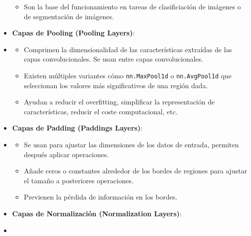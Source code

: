 \begin{itemize}
\begin{itemize}
            \item Son la base del funcionamiento en tareas de clasificiación de imágenes o de segmentación de imágenes.
        \end{itemize}
    \item \textbf{Capas de Pooling (Pooling Layers)}:
    \item[]
        \begin{itemize}
            \item Comprimen la dimensionalidad de las características extraídas de las capas convolucionales. Se usan entre capas convolucionales.
            \item Existen múltiples variantes cómo \texttt{nn.MaxPool1d} o \texttt{nn.AvgPool1d} que seleccionan los valores más significativos de una región dada.
            \item Ayudan a reducir el {overfitting}, simplificar la representación de características, reducir el coste computacional, etc.
        \end{itemize}
    \item \textbf{Capas de Padding (Paddings Layers)}:
    \item[]
        \begin{itemize}
            \item Se usan para ajustar las dimensiones de los datos de entrada, permiten después aplicar operaciones.
            \item Añade ceros o constantes alrededor de los bordes de regiones para ajustar el tamaño a posteriores operaciones.
            \item Previenen la pérdida de información en los bordes.
        \end{itemize}
    \item \textbf{Capas de Normalización (Normalization Layers)}:
    \item[]

\end{itemize}
